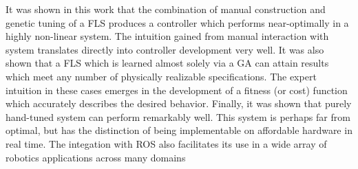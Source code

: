 It was shown in this work that the combination of manual construction and genetic tuning of a FLS produces a
controller which performs near-optimally in a highly non-linear system. The intuition gained from manual
interaction with system translates directly into controller development very well. It was also shown that a
FLS which is learned almost solely via a GA can attain results which meet any number of physically realizable
specifications. The expert intuition in these cases emerges in the development of a fitness (or cost) function
which accurately describes the desired behavior. Finally, it was shown that purely hand-tuned system can
perform remarkably well. This system is perhaps far from optimal, but has the distinction of being
implementable on affordable hardware in real time. The integation with ROS also facilitates its use in a wide
array of robotics applications across many domains


